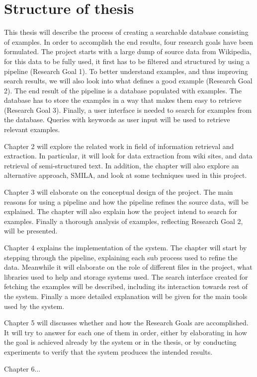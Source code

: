 \section{Structure of thesis}
This thesis will describe the process of creating a searchable database consisting of examples. In order to accomplish the end results, four research goals have been formulated. The project starts with a large dump of source data from Wikipedia, for this data to be fully used, it first has to be filtered and structured by using a pipeline (Research Goal 1). To better understand examples, and thus improving search results, we will also look into what defines a good example (Research Goal 2). The end result of the pipeline is a database populated with examples. The database has to store the examples in a way that makes them easy to retrieve (Research Goal 3). Finally, a user interface is needed to search for examples from the database. Queries with keywords as user input will be used to retrieve relevant examples.

Chapter 2 will explore the related work in field of information retrieval and extraction. In particular, it will look for data extraction from wiki sites, and data retrieval of semi-structured text. In addition, the chapter will also explore an alternative approach, SMILA, and look at some techniques used in this project.

Chapter 3 will elaborate on the conceptual design of the project. The main reasons for using a pipeline and how the pipeline refines the source data, will be explained. The chapter will also explain how the project intend to search for examples. Finally a thorough analysis of examples, reflecting Research Goal 2, will be presented.

Chapter 4 explains the implementation of the system. The chapter will start by stepping through the pipeline, explaining each sub process used to refine the data. Meanwhile it will elaborate on the role of different files in the project, what libraries used to help and storage systems used. The search interface created for fetching the examples will be described, including its interaction towards rest of the system. Finally a more detailed explanation will be given for the main tools used by the system.

Chapter 5 will discusses whether and how the Research Goals are accomplished. It will try to answer for each one of them in order, either by elaborating in how the goal is achieved already by the system or in the thesis, or by conducting experiments to verify that the system produces the intended results.

Chapter 6...


\cleardoublepage